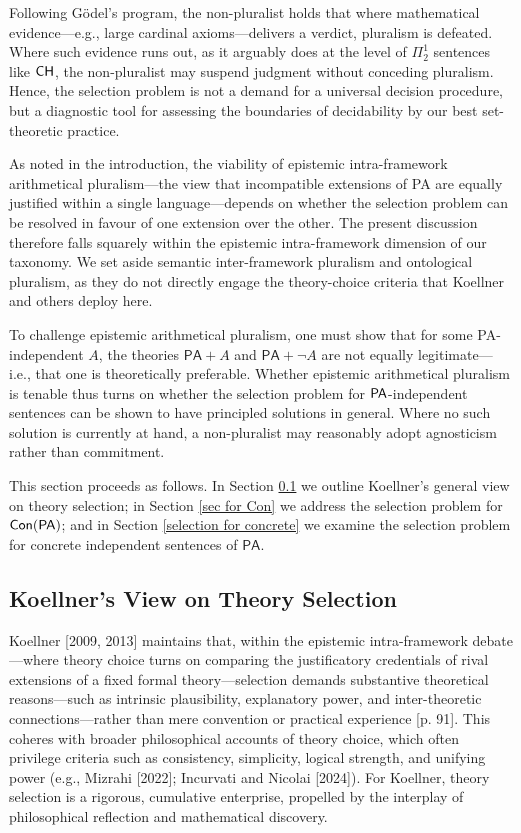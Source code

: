 \documentclass[a4paper,12pt]{amsart}
\theoremstyle{definition}
\numberwithin{equation}{section}
\begin{document}
Following Gödel's program, the non-pluralist holds that where mathematical evidence—e.g., large cardinal axioms—delivers a verdict, pluralism is defeated. Where such evidence runs out, as it arguably does at the level of \(\Pi^1_2\) sentences like $\sf CH$, the non-pluralist may suspend judgment without conceding pluralism. Hence, the selection problem is not a demand for a universal decision procedure, but a diagnostic tool for assessing the boundaries of decidability by our best set-theoretic practice.

As noted in the introduction, the viability of epistemic intra-framework arithmetical pluralism—the view that incompatible extensions of {\sf PA} are equally justified within a single language—depends on whether the selection problem can be resolved in favour of one extension over the other. The present discussion therefore falls squarely within the epistemic intra-framework dimension of our taxonomy. We set aside semantic inter-framework pluralism and ontological pluralism, as they do not directly engage the theory-choice criteria that Koellner and others deploy here.


To challenge epistemic arithmetical pluralism, one must show that for some {\sf PA}-independent \(A\), the theories \(\mathsf{PA}+A\) and \(\mathsf{PA}+\neg A\) are not equally legitimate—i.e., that one is theoretically preferable. Whether epistemic arithmetical pluralism is tenable thus turns on whether the selection problem for ${\sf PA}$-independent sentences can be shown to have principled solutions in general. Where no such solution is currently at hand, a non-pluralist may reasonably adopt agnosticism rather than commitment.

This section proceeds as follows. In Section \ref{theory selection} we outline Koellner's general view on theory selection; in Section \ref{sec for Con} we address the selection problem for ${\sf Con(PA)}$; and in Section \ref{selection for concrete} we examine the selection problem for concrete independent sentences of \(\mathsf{PA}\).

\subsection{Koellner's View on Theory Selection}\label{theory selection}

Koellner [2009, 2013] maintains that, within the epistemic intra-framework debate—where theory choice turns on comparing the justificatory credentials of rival extensions of a fixed formal theory—selection demands substantive theoretical reasons—such as intrinsic plausibility, explanatory power, and inter-theoretic connections—rather than mere convention or practical experience [p. 91]. This coheres with broader philosophical accounts of theory choice, which often privilege criteria such as consistency, simplicity, logical strength, and unifying power (e.g., Mizrahi [2022]; Incurvati and Nicolai [2024]). For Koellner, theory selection is a rigorous, cumulative enterprise, propelled by the interplay of philosophical reflection and mathematical discovery.
      
\end{document}

